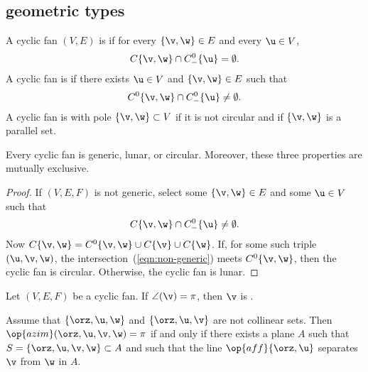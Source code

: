 \subsection{geometric types}\label{sec:types}

\begin{definition}
A cyclic fan $(V,E)$ is  if for every $\{\v,\w\}\in E$
and every $\u\in V$, 
\begin{displaymath}
C\{\v,\w\}\cap C^0_-\{\u\} = \emptyset.
\end{displaymath}
A cyclic fan is  if there exists $\u\in V$ and
$\{\v,\w\}\in E$ such that
\begin{displaymath}
C^0\{\v,\w\}\cap C^0_-\{\u\}\ne \emptyset.
\end{displaymath}
A cyclic fan is  with pole $\{\v,\w\} \subset V$ if it is not
circular and if $\{\v,\w\}$ is a parallel set.
\end{definition}
%
%
%


\begin{lemma} Every cyclic fan is
generic, lunar, or circular.  Moreover, these three properties are
mutually exclusive.
\end{lemma}
%
%
%
%
%

\begin{proof} If $(V,E,F)$ is not generic,  select some $\{\v,\w\}\in E$
and some $\u\in V$ such that
\begin{equation}\label{eqn:non-generic}
C\{\v,\w\}\cap C^0_-\{\u\} \ne \emptyset.
\end{equation}
Now $C\{\v,\w\} = C^0\{\v,\w\} \cup C\{\v\}\cup C\{\w\}$.  If, for
some such triple $(\u,\v,\w)$, the
intersection~(\ref{eqn:non-generic}) meets $C^0\{\v,\w\}$, then the
cyclic fan is circular.  Otherwise, the cyclic fan is lunar.
\end{proof}

\begin{definition}[flat] Let $(V,E,F)$ be a cyclic fan.
If $\angle(\v)=\pi$, then $\v$ is .
\end{definition}


\begin{lemma}  \label{lemma:coplanar}
Assume that $\{\orz,\u,\w\}$ and $\{\orz,\u,\v\}$ are not collinear sets.
Then $\op{azim}(\orz,\u,\v,\w)=\pi$ if and only if
there exists a plane $A$ such that $S=\{\orz,\u,\v,\w\}\subset A$
and such that the line $\op{aff}\{\orz,\u\}$ separates $\v$ from
$\w$ in $A$.
\end{lemma}


